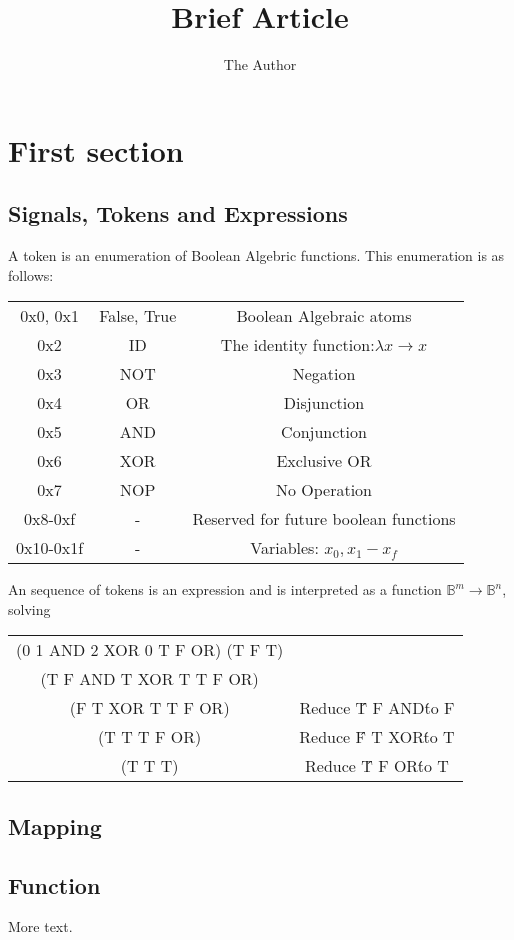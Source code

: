 \documentclass[11pt]{article} %
\title{Brief Article}
\author{The Author}
\begin{document}
\maketitle

\section{First section}

\subsection{Signals, Tokens and Expressions}
	A token is an enumeration of Boolean Algebric functions. This enumeration is as follows:\\
	\begin{tabular}{ |c|c|c| }
  		0x0, 0x1 & False, True & Boolean Algebraic atoms\\
  		0x2 & ID & The identity function:$ \lambda x \rightarrow x$\\
  		0x3 & NOT & Negation \\
		0x4 & OR & Disjunction \\
		0x5 & AND & Conjunction \\
		0x6 & XOR & Exclusive OR \\
		0x7 & NOP & No Operation\\
		0x8-0xf & - & Reserved for future boolean functions\\
		0x10-0x1f & - & Variables: $x_0, x_1 - x_f$\\
	\end{tabular}

	An sequence of tokens is an expression and is interpreted as a function $ \mathbb{B}^m \rightarrow \mathbb{B}^n $, solving 

	\begin{tabular}{ |c|c| }
		(0 1 AND 2 XOR 0 T F OR) (T F T) \\
		(T F AND T XOR T T F OR) \\
		(F T XOR T T F OR) & Reduce \'T F AND\' to F \\
		(T T T F OR) & Reduce \'F T XOR\' to T \\
		(T T T) & Reduce \'T F OR\' to T \\
	\end{tabular}

\subsection{Mapping}


\subsection{Function}

More text.
\end{document}
